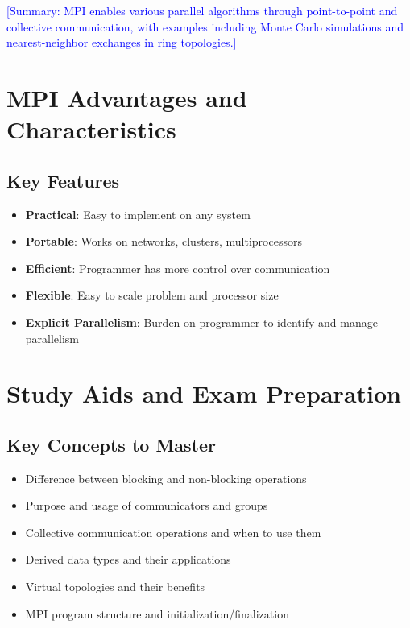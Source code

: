 \documentclass[12pt]{article}
\begin{document}
\textcolor{blue}{[Summary: MPI enables various parallel algorithms through point-to-point and collective communication, with examples including Monte Carlo simulations and nearest-neighbor exchanges in ring topologies.]}

\section{MPI Advantages and Characteristics}

\subsection{Key Features}
\begin{itemize}
    \item \textbf{Practical}: Easy to implement on any system
    \item \textbf{Portable}: Works on networks, clusters, multiprocessors
    \item \textbf{Efficient}: Programmer has more control over communication
    \item \textbf{Flexible}: Easy to scale problem and processor size
    \item \textbf{Explicit Parallelism}: Burden on programmer to identify and manage parallelism
\end{itemize}

\section{Study Aids and Exam Preparation}

\subsection*{Key Concepts to Master}
\begin{itemize}
    \item Difference between blocking and non-blocking operations
    \item Purpose and usage of communicators and groups
    \item Collective communication operations and when to use them
    \item Derived data types and their applications
    \item Virtual topologies and their benefits
    \item MPI program structure and initialization/finalization
\end{itemize}
\end{document}
